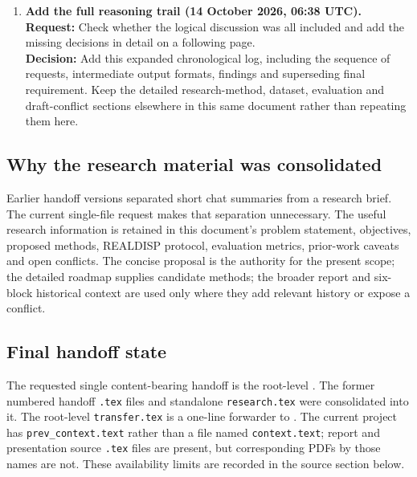 \documentclass[10pt,a4paper]{article}
\begin{document}
\begin{enumerate}[label=\textbf{Step \arabic*.}]
\item \textbf{Add the full reasoning trail (14 October 2026, 06:38 UTC).}
\textbf{Request:} Check whether the logical discussion was all included and add the missing decisions in detail on a following page.\\
\textbf{Decision:} Add this expanded chronological log, including the sequence of requests, intermediate output formats, findings and superseding final requirement. Keep the detailed research-method, dataset, evaluation and draft-conflict sections elsewhere in this same document rather than repeating them here.
\end{enumerate}

\subsection*{Why the research material was consolidated}
Earlier handoff versions separated short chat summaries from a research brief. The current single-file request makes that separation unnecessary. The useful research information is retained in this document's problem statement, objectives, proposed methods, REALDISP protocol, evaluation metrics, prior-work caveats and open conflicts. The concise proposal is the authority for the present scope; the detailed roadmap supplies candidate methods; the broader report and six-block historical context are used only where they add relevant history or expose a conflict.

\subsection*{Final handoff state}
The requested single content-bearing handoff is the root-level . The former numbered handoff \texttt{.tex} files and standalone \texttt{research.tex} were consolidated into it. The root-level \texttt{transfer.tex} is a one-line forwarder to . The current project has \texttt{prev\_context.text} rather than a file named \texttt{context.text}; report and presentation source \texttt{.tex} files are present, but corresponding PDFs by those names are not. These availability limits are recorded in the source section below.
\end{document}
